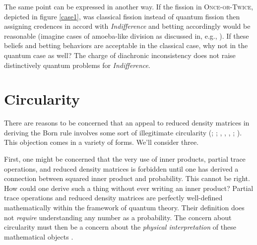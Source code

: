 \documentclass[12pt,onecolumn,secnumarabic,amsmath,amssymb,balancelastpage,nofootinbib]{article}
\begin{document}
The same point can be expressed in another way.  If the fission in \textsc{Once-or-Twice}, depicted in figure \ref{case1}, was classical fission instead of quantum fission then assigning credences in accord with \emph{Indifference} and betting accordingly would be reasonable (imagine cases of amoeba-like division as discussed in, e.g., \citealp{parfit1971}).  If these beliefs and betting behaviors are acceptable in the classical case, why not in the quantum case as well?  The charge of diachronic inconsistency does not raise distinctively quantum problems for \emph{Indifference}.
  

\section{Circularity}\label{subsys}

There are reasons to be concerned that an appeal to reduced density matrices in deriving the Born rule involves some sort of illegitimate circularity (\citealp{zeh1997,baker2007}; \citealp[.2]{schlosshauer}; \citeauthor{zurek2003b}, \citeyear{zurek2003b}, \citeyear{zurek2005}, \citeyear{zurek2010}; \citealp[]{kent2010}). This objection comes in a variety of forms.  We'll consider three.

First, one might be concerned that the very use of inner products, partial trace operations, and reduced density matrices is forbidden until one has derived a connection between squared inner product and probability.  This cannot be right.  How could one derive such a thing without ever writing an inner product?  Partial trace operations and reduced density matrices are perfectly well-defined mathematically within the framework of quantum theory.  Their definition does not \emph{require} understanding any number as a probability.  The concern about circularity must then be a concern about the \emph{physical interpretation} of these mathematical objects \citep[see also][FAQ \#6]{zurek2010}.
\end{document}

